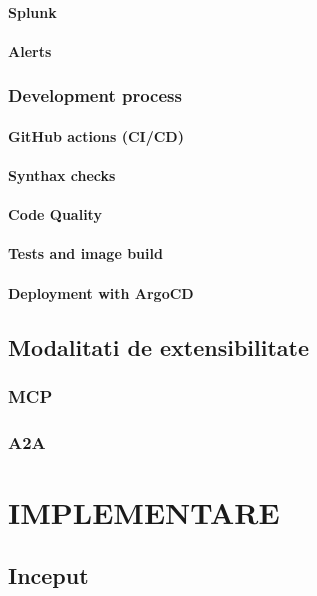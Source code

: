 \documentclass[12pt, a4paper, oneside, romanian, draft]{teza-upb}
\begin{document}
      \subsubsection{Splunk}
      \subsubsection{Alerts}
    \subsection{Development process}
      \subsubsection{GitHub actions (CI/CD)}
      \subsubsection{Synthax checks}
      \subsubsection{Code Quality}
      \subsubsection{Tests and image build}
      \subsubsection{Deployment with ArgoCD}


  \section{Modalitati de extensibilitate}
    \subsection{MCP}
    \subsection{A2A}


\chapter{IMPLEMENTARE}

  \section{Inceput}
\end{document}
